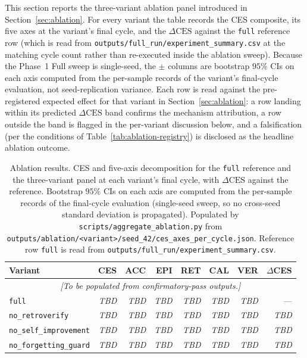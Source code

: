 This section reports the three-variant ablation panel introduced in Section~\ref{sec:ablation}. For every variant the table records the CES composite, its five axes at the variant's final cycle, and the $\Delta\text{CES}$ against the \texttt{full} reference row (which is read from \texttt{outputs/full\_run/experiment\_summary.csv} at the matching cycle count rather than re-executed inside the ablation sweep). Because the Phase~1 Full sweep is single-seed, the $\pm$ columns are bootstrap $95\%$ CIs on each axis computed from the per-sample records of the variant's final-cycle evaluation, not seed-replication variance. Each row is read against the pre-registered expected effect for that variant in Section~\ref{sec:ablation}: a row landing within its predicted $\Delta\text{CES}$ band confirms the mechanism attribution, a row outside the band is flagged in the per-variant discussion below, and a falsification (per the conditions of Table~\ref{tab:ablation-registry}) is disclosed as the headline ablation outcome.

\begin{table}[t]
\centering
\caption{Ablation results. CES and five-axis decomposition for the \texttt{full} reference and the three-variant panel at each variant's final cycle, with $\Delta\text{CES}$ against the reference. Bootstrap $95\%$ CIs on each axis are computed from the per-sample records of the final-cycle evaluation (single-seed sweep, so no cross-seed standard deviation is propagated). Populated by \texttt{scripts/aggregate\_ablation.py} from \texttt{outputs/ablation/<variant>/seed\_42/ces\_axes\_per\_cycle.json}. Reference row \texttt{full} is read from \texttt{outputs/full\_run/experiment\_summary.csv}.}
\label{tab:ablation-main}
\small
\begin{tabular}{lrrrrrrr}
\toprule
Variant & CES & ACC & EPI & RET & CAL & VER & $\Delta$CES \\
\midrule
\multicolumn{8}{c}{\emph{[To be populated from confirmatory-pass outputs.]}}\\
\texttt{full}                    & \textit{TBD} & \textit{TBD} & \textit{TBD} & \textit{TBD} & \textit{TBD} & \textit{TBD} & ---          \\
\texttt{no\_retroverify}         & \textit{TBD} & \textit{TBD} & \textit{TBD} & \textit{TBD} & \textit{TBD} & \textit{TBD} & \textit{TBD} \\
\texttt{no\_self\_improvement}   & \textit{TBD} & \textit{TBD} & \textit{TBD} & \textit{TBD} & \textit{TBD} & \textit{TBD} & \textit{TBD} \\
\texttt{no\_forgetting\_guard}   & \textit{TBD} & \textit{TBD} & \textit{TBD} & \textit{TBD} & \textit{TBD} & \textit{TBD} & \textit{TBD} \\
\bottomrule
\end{tabular}
\end{table}

